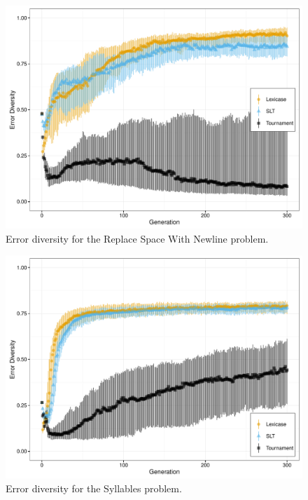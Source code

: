 \documentclass{sig-alternate}
\begin{document}
\begin{figure}[t] %
\centering
\includegraphics[width=\linewidth]{rswn-div.pdf}
\caption{Error diversity for the Replace Space With Newline problem.}
\label{fig:rswn-div}
\end{figure}

\begin{figure}[t] %
\centering
\includegraphics[width=\linewidth]{syllables-div.pdf}
\caption{Error diversity for the Syllables problem.}
\label{fig:syllables-div}
\end{figure}
\end{document}
